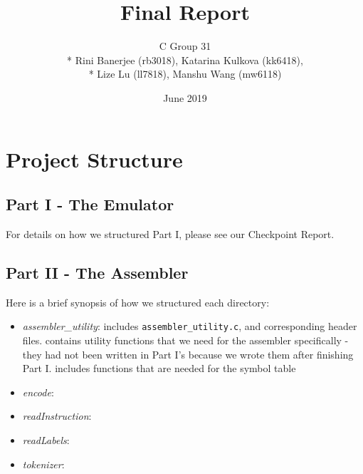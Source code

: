 \documentclass[letterpaper,11pt]{article}
\begin{document}
    \title{\textbf{Final Report}}
    \author{C Group 31\\* Rini Banerjee (rb3018), Katarina Kulkova (kk6418),\\* Lize Lu (ll7818), Manshu Wang (mw6118)}
    \date{June 2019}
    \maketitle

    \section{Project Structure}
    \subsection{Part I - The Emulator}
    For details on how we structured Part I, please see our Checkpoint Report.

    \subsection{Part II - The Assembler}

    \noindent Here is a brief synopsis of how we structured each directory:

    \begin{itemize}
        \item \textit{assembler\_utility}: includes \texttt{assembler\_utility.c},  and corresponding header files.  contains utility functions that we need for the assembler specifically - they had not been written in Part I's  because we wrote them after finishing Part I.  includes functions that are needed for the symbol table
        \item \textit{encode}:
        \item \textit{readInstruction}:
        \item \textit{readLabels}:
        \item \textit{tokenizer}:
    \end{itemize}
\end{document}

